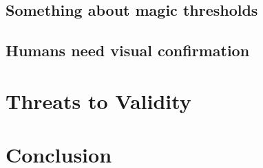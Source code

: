 \documentclass[acmsmall,screen,review,anonymous]{acmart}
\begin{document}
\subsection{Something about magic thresholds}\label{sec:magic-threshold}



\subsection{Humans need visual confirmation}\label{sec:visual}



\section{Threats to Validity}\label{sec:threats}

\section{Conclusion}\label{sec:conclude}



\end{document}
